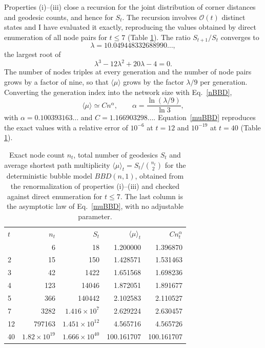 \documentclass[reprint,aps,pre,amsmath,amssymb,superscriptaddress,showpacs]{revtex4-1}
\begin{document}
Properties (i)--(iii) close a recursion for the joint distribution of corner distances and geodesic counts, and hence for $S_t$. The recursion involves $\mathcal{O}(t)$ distinct states and I have evaluated it exactly, reproducing the values obtained by direct enumeration of all node pairs for $t\leq7$ (Table \ref{tab:bbd}). The ratio $S_{t+1}/S_t$ converges to
%
\begin{equation}
\lambda = 10.049448332688990\ldots,
\label{lambdaBBD}
\end{equation}
%
the largest root of
%
\begin{equation}
\lambda^3 - 12\lambda^2 + 20\lambda - 4 = 0.
\label{cubicBBD}
\end{equation}
%
The number of nodes triples at every generation and the number of node pairs grows by a factor of nine, so that $\langle\mu\rangle$ grows by the factor $\lambda/9$ per generation. Converting the generation index into the network size with Eq.~\eqref{nBBD},
%
\begin{equation}
\langle\mu\rangle \simeq C n^{\alpha}, \qquad \alpha = \frac{\ln (\lambda/9)}{\ln 3},
\label{muBBD}
\end{equation}
%
with $\alpha = 0.100393163\ldots$ and $C = 1.166903298\ldots$. Equation~\eqref{muBBD} reproduces the exact values with a relative error of $10^{-6}$ at $t=12$ and $10^{-19}$ at $t=40$ (Table \ref{tab:bbd}).

\begin{table}[t]
\caption{Exact node count $n_t$, total number of geodesics $S_t$ and average shortest path multiplicity $\langle\mu\rangle_t = S_t/\binom{n_t}{2}$ for the deterministic bubble model $BBD(n,1)$, obtained from the renormalization of properties (i)--(iii) and checked against direct enumeration for $t\leq7$. The last column is the asymptotic law of Eq.~\eqref{muBBD}, with no adjustable parameter.}
\label{tab:bbd}
\begin{ruledtabular}
\begin{tabular}{lrrrr}
$t$ & $n_t$ & $S_t$ & $\langle\mu\rangle_t$ & $C n_t^\alpha$ \\
\colrule
1  & 6                    & 18                    & 1.200000   & 1.396870 \\
2  & 15                   & 150                   & 1.428571   & 1.531463 \\
3  & 42                   & 1422                  & 1.651568   & 1.698236 \\
4  & 123                  & 14046                 & 1.872051   & 1.891677 \\
5  & 366                  & 140442                & 2.102583   & 2.110527 \\
7  & 3282                 & $1.416\times10^{7}$   & 2.629224   & 2.630457 \\
12 & 797163               & $1.451\times10^{12}$  & 4.565716   & 4.565726 \\
40 & $1.82\times10^{19}$  & $1.666\times10^{40}$  & 100.161707 & 100.161707 \\
\end{tabular}
\end{ruledtabular}
\end{table}
\end{document}
